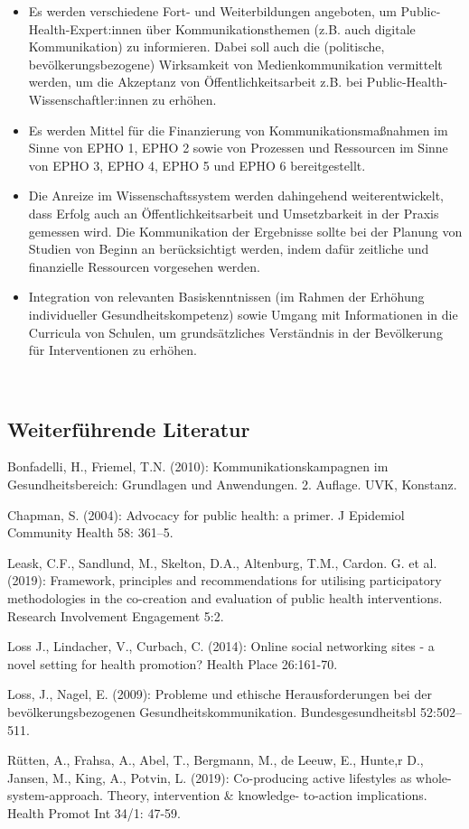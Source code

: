 \documentclass{article}
\begin{document}
\begin{itemize}
\item Es werden verschiedene Fort- und Weiterbildungen angeboten, um Public-Health-Expert:innen über Kommunikationsthemen (z.B. auch digitale Kommunikation) zu informieren. Dabei soll auch die (politische, bevölkerungsbezogene) Wirksamkeit von Medienkommunikation vermittelt werden, um die Akzeptanz von Öffentlichkeitsarbeit z.B. bei Public-Health-Wissenschaftler:innen zu erhöhen.


\item Es werden Mittel für die Finanzierung von Kommunikationsmaßnahmen im Sinne von EPHO 1, EPHO 2 sowie von Prozessen und Ressourcen im Sinne von EPHO 3, EPHO 4, EPHO 5 und EPHO 6 bereitgestellt.


\item Die Anreize im Wissenschaftssystem werden dahingehend weiterentwickelt, dass Erfolg auch an Öffentlichkeitsarbeit und Umsetzbarkeit in der Praxis gemessen wird. Die Kommunikation der Ergebnisse sollte bei der Planung von Studien von Beginn an berücksichtigt werden, indem dafür zeitliche und finanzielle Ressourcen vorgesehen werden.


\item Integration von relevanten Basiskenntnissen (im Rahmen der Erhöhung individueller Gesundheitskompetenz) sowie Umgang mit Informationen in die Curricula von Schulen, um grundsätzliches Verständnis in der Bevölkerung für Interventionen zu erhöhen.


\end{itemize}

 


\subsection{Weiterführende Literatur}\label{H8908959}



Bonfadelli, H., Friemel, T.N. (2010): Kommunikationskampagnen im Gesundheitsbereich: Grundlagen und Anwendungen. 2. Auflage. UVK, Konstanz.


Chapman, S. (2004): Advocacy for public health: a primer. J Epidemiol Community Health 58: 361–5.


Leask, C.F., Sandlund, M., Skelton, D.A., Altenburg, T.M., Cardon. G. et al. (2019): Framework, principles and recommendations for utilising participatory methodologies in the co-creation and evaluation of public health interventions. Research Involvement Engagement 5:2.


Loss J., Lindacher, V., Curbach, C. (2014): Online social networking sites - a novel setting for health promotion? Health Place 26:161-70. 


Loss, J., Nagel, E. (2009): Probleme und ethische Herausforderungen bei der bevölkerungsbezogenen Gesundheitskommunikation. Bundesgesundheitsbl 52:502–511. 


Rütten, A., Frahsa, A., Abel, T., Bergmann, M., de Leeuw, E., Hunte,r D., Jansen, M., King, A., Potvin, L. (2019): Co-producing active lifestyles as whole-system-approach. Theory, intervention \& knowledge- to-action implications. Health Promot Int 34/1: 47-59.
\end{document}
